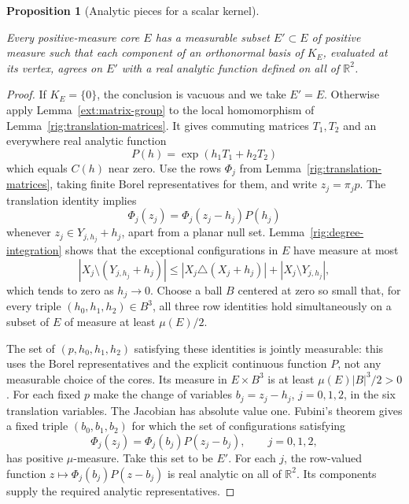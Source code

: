\documentclass[11pt]{amsart}
\newcommand{\R}{\mathbb R}
\newtheorem{proposition}[theorem]{Proposition}
\theoremstyle{definition}
\theoremstyle{remark}
\numberwithin{equation}{section}
\providecommand{\lean}[1]{}
\providecommand{\leanok}{}
\begin{document}
\begin{proposition}[Analytic pieces for a scalar kernel]\label{rig:pieces}
\lean{Auto.rig_pieces}
\leanok
Every positive-measure core $E$ has a measurable subset $E'\subset E$
of positive measure such that each component of an orthonormal basis of
$K_E$, evaluated at its vertex, agrees on $E'$ with a real analytic
function defined on all of $\R^2$.
\end{proposition}
\begin{proof}
If $K_E=\{0\}$, the conclusion is vacuous and we take $E'=E$.
Otherwise apply Lemma~\ref{ext:matrix-group} to the local homomorphism
of Lemma~\ref{rig:translation-matrices}.  It gives commuting matrices
$T_1,T_2$ and an everywhere real analytic function
\[
 P(h)=\exp(h_1T_1+h_2T_2)
\]
which equals $C(h)$ near zero.  Use the rows $\Phi_j$ from
Lemma~\ref{rig:translation-matrices}, taking finite Borel
representatives for them, and write $z_j=\pi_jp$.
The translation identity implies
\[
 \Phi_j(z_j)=\Phi_j(z_j-h_j)P(h_j)
\]
whenever $z_j\in Y_{j,h_j}+h_j$, apart from a planar null set.
Lemma~\ref{rig:degree-integration} shows that the exceptional
configurations in $E$ have measure at most
\[
 |X_j\setminus(Y_{j,h_j}+h_j)|
 \le |X_j\triangle(X_j+h_j)|+|X_j\setminus Y_{j,h_j}|,
\]
which tends to zero as $h_j\to0$.
Choose a ball $B$ centered at zero so small that, for every triple
$(h_0,h_1,h_2)\in B^3$, all three row identities hold simultaneously
on a subset of $E$ of measure at least $\mu(E)/2$.

The set of $(p,h_0,h_1,h_2)$ satisfying these identities is jointly
measurable: this uses the Borel representatives and the explicit
continuous function $P$, not any measurable choice of the cores.
Its measure in $E\times B^3$ is at least $\mu(E)|B|^3/2>0$.
For each fixed $p$ make the change of variables
$b_j=z_j-h_j$, $j=0,1,2$, in the six translation variables.
The Jacobian has absolute value one. Fubini's theorem gives a fixed
triple $(b_0,b_1,b_2)$ for which the set of configurations satisfying
\[
 \Phi_j(z_j)=\Phi_j(b_j)P(z_j-b_j),\qquad j=0,1,2,
\]
has positive $\mu$-measure. Take this set to be $E'$.
For each $j$, the row-valued function
$z\mapsto\Phi_j(b_j)P(z-b_j)$ is real analytic on all of $\R^2$.
Its components supply the required analytic representatives.
\end{proof}
\end{document}
